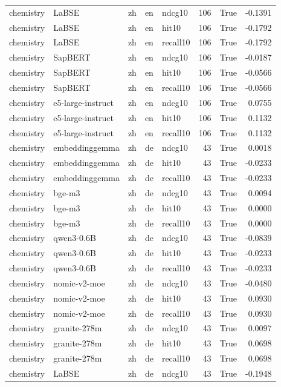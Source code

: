 \begin{tabular}{lllllrrr}
chemistry & LaBSE & zh & en & ndcg10 & 106 & True & -0.1391 \\
chemistry & LaBSE & zh & en & hit10 & 106 & True & -0.1792 \\
chemistry & LaBSE & zh & en & recall10 & 106 & True & -0.1792 \\
chemistry & SapBERT & zh & en & ndcg10 & 106 & True & -0.0187 \\
chemistry & SapBERT & zh & en & hit10 & 106 & True & -0.0566 \\
chemistry & SapBERT & zh & en & recall10 & 106 & True & -0.0566 \\
chemistry & e5-large-instruct & zh & en & ndcg10 & 106 & True & 0.0755 \\
chemistry & e5-large-instruct & zh & en & hit10 & 106 & True & 0.1132 \\
chemistry & e5-large-instruct & zh & en & recall10 & 106 & True & 0.1132 \\
chemistry & embeddinggemma & zh & de & ndcg10 & 43 & True & 0.0018 \\
chemistry & embeddinggemma & zh & de & hit10 & 43 & True & -0.0233 \\
chemistry & embeddinggemma & zh & de & recall10 & 43 & True & -0.0233 \\
chemistry & bge-m3 & zh & de & ndcg10 & 43 & True & 0.0094 \\
chemistry & bge-m3 & zh & de & hit10 & 43 & True & 0.0000 \\
chemistry & bge-m3 & zh & de & recall10 & 43 & True & 0.0000 \\
chemistry & qwen3-0.6B & zh & de & ndcg10 & 43 & True & -0.0839 \\
chemistry & qwen3-0.6B & zh & de & hit10 & 43 & True & -0.0233 \\
chemistry & qwen3-0.6B & zh & de & recall10 & 43 & True & -0.0233 \\
chemistry & nomic-v2-moe & zh & de & ndcg10 & 43 & True & -0.0480 \\
chemistry & nomic-v2-moe & zh & de & hit10 & 43 & True & 0.0930 \\
chemistry & nomic-v2-moe & zh & de & recall10 & 43 & True & 0.0930 \\
chemistry & granite-278m & zh & de & ndcg10 & 43 & True & 0.0097 \\
chemistry & granite-278m & zh & de & hit10 & 43 & True & 0.0698 \\
chemistry & granite-278m & zh & de & recall10 & 43 & True & 0.0698 \\
chemistry & LaBSE & zh & de & ndcg10 & 43 & True & -0.1948 \\

\end{tabular}
